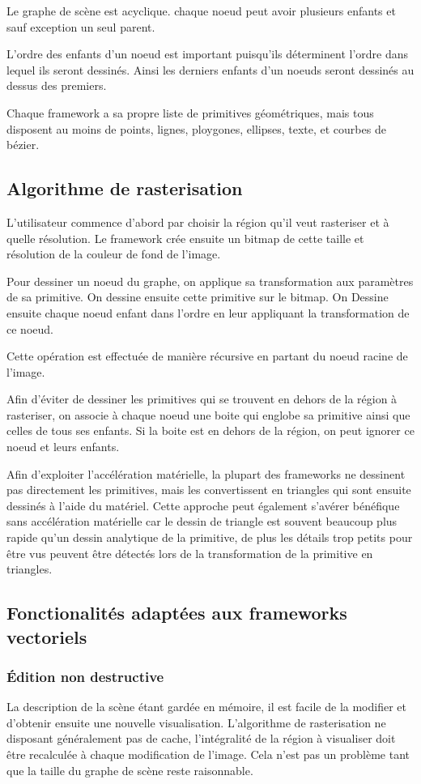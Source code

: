 			Le graphe de scène est acyclique. chaque noeud peut avoir plusieurs enfants et sauf exception un seul parent. 

			L'ordre des enfants d'un noeud est important puisqu'ils déterminent l'ordre dans lequel ils seront dessinés. Ainsi les derniers
			enfants d'un noeuds seront dessinés au dessus des premiers. 

			Chaque framework a sa propre liste de primitives géométriques, mais tous disposent au moins de points, lignes, ploygones, ellipses,
			texte, et courbes de bézier.

		\subsection{Algorithme de rasterisation}
			L'utilisateur commence d'abord par choisir la région qu'il veut rasteriser et à quelle résolution. Le framework crée ensuite un bitmap
			de cette taille et résolution de la couleur de fond de l'image.

			Pour dessiner un noeud du graphe, on applique sa transformation aux paramètres de sa primitive. On dessine ensuite cette 
			primitive sur le bitmap. On Dessine ensuite chaque noeud enfant dans l'ordre en leur appliquant la transformation de ce noeud.

			Cette opération est effectuée de manière récursive en partant du noeud racine de l'image.

			Afin d'éviter de dessiner les primitives qui se trouvent en dehors de la région à rasteriser, on associe à chaque noeud une boite
			qui englobe sa primitive ainsi que celles de tous ses enfants. Si la boite est en dehors de la région, on peut ignorer ce noeud et
			leurs enfants. 

			Afin d'exploiter l'accélération matérielle, la plupart des frameworks ne dessinent pas directement les primitives, mais les 
			convertissent en triangles qui sont ensuite dessinés à l'aide du matériel. Cette approche peut également s'avérer bénéfique 
			sans accélération matérielle car le dessin de triangle est souvent beaucoup plus rapide qu'un dessin analytique de la primitive,
			de plus les détails trop petits pour être vus peuvent être détectés lors de la transformation de la primitive en triangles.

		\subsection{Fonctionalités adaptées aux frameworks vectoriels}
			\subsubsection{Édition non destructive}
				La description de la scène étant gardée en mémoire, il est facile de la modifier et d'obtenir ensuite une nouvelle visualisation.
				L'algorithme de rasterisation ne disposant généralement pas de cache, l'intégralité de la région à visualiser doit être recalculée à chaque 
				modification de l'image. Cela n'est pas un problème tant que la taille du graphe de scène reste raisonnable.
